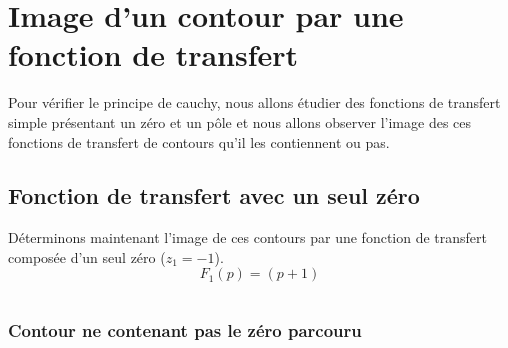 \section{Image d'un contour par une fonction de transfert
\label{image-dun-contour-par-une-fonction-de-transfert}}
Pour vérifier le principe de cauchy, nous allons étudier des fonctions de 
transfert simple présentant un zéro et un pôle et nous allons observer l'image
des ces fonctions de transfert de contours qu'il les contiennent ou pas.
\subsection{Fonction de transfert avec un seul zéro
\label{fonction-de-transfert-avec-un-seul-zuxe9ro}}
Déterminons maintenant l'image de ces contours par une fonction de
transfert composée d'un seul zéro (\(z_1=-1\)).
\[
F_1(p)=(p+1)
\]
\begin{tcolorbox}[breakable, size=fbox, boxrule=1pt, 
    pad at break*=1mm,colback=cellbackground, colframe=cellborder]
\inputminted{python}{codes/python/annexe_cauchy_cellule6.py}
\end{tcolorbox}
\subsubsection{Contour ne contenant pas le zéro parcouru
\label{contour-nentourant-pas-le-zuxe9ro-parcouru}}
